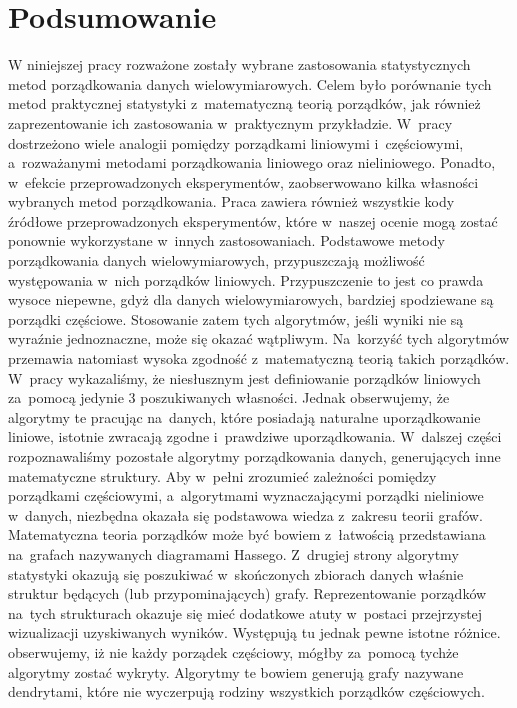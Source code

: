 \documentclass[12pt,a4paper]{report}
\begin{document}
\chapter{Podsumowanie}
W niniejszej pracy rozważone zostały wybrane zastosowania statystycznych metod porządkowania danych wielowymiarowych. Celem było porównanie tych metod praktycznej statystyki z~matematyczną teorią porządków, jak również zaprezentowanie ich zastosowania w~praktycznym przykładzie. W~pracy dostrzeżono wiele analogii pomiędzy porządkami liniowymi i~częściowymi, a~rozważanymi metodami porządkowania liniowego oraz nieliniowego. Ponadto, w~efekcie przeprowadzonych eksperymentów, zaobserwowano kilka własności wybranych metod porządkowania. Praca zawiera również wszystkie kody źródłowe przeprowadzonych eksperymentów, które w~naszej ocenie mogą zostać ponownie wykorzystane w~innych zastosowaniach.
Podstawowe metody porządkowania danych wielowymiarowych, przypuszczają możliwość występowania w~nich porządków liniowych. Przypuszczenie to jest co prawda wysoce niepewne, gdyż dla danych wielowymiarowych, bardziej spodziewane są porządki częściowe. Stosowanie zatem tych algorytmów, jeśli wyniki nie są wyraźnie jednoznaczne, może się okazać wątpliwym. Na~korzyść tych algorytmów przemawia natomiast wysoka zgodność z~matematyczną teorią takich porządków. W~pracy wykazaliśmy, że niesłusznym jest definiowanie porządków liniowych za~pomocą jedynie 3 poszukiwanych własności. Jednak obserwujemy, że algorytmy te pracując na~danych, które posiadają naturalne uporządkowanie liniowe, istotnie zwracają zgodne i~prawdziwe uporządkowania. W~dalszej części rozpoznawaliśmy pozostałe algorytmy porządkowania danych, generujących inne matematyczne struktury.
Aby w~pełni zrozumieć zależności pomiędzy porządkami częściowymi, a~algorytmami wyznaczającymi porządki nieliniowe w~danych, niezbędna okazała się podstawowa wiedza z~zakresu teorii grafów. Matematyczna teoria porządków może być bowiem z~łatwością przedstawiana na~grafach nazywanych diagramami Hassego. Z~drugiej strony algorytmy statystyki okazują się poszukiwać w~skończonych zbiorach danych właśnie struktur będących (lub przypominających) grafy. Reprezentowanie porządków na~tych strukturach okazuje się mieć dodatkowe atuty w~postaci przejrzystej wizualizacji uzyskiwanych wyników. Występują tu jednak pewne istotne różnice. obserwujemy, iż nie każdy porządek częściowy, mógłby za~pomocą tychże algorytmy zostać wykryty. Algorytmy te bowiem generują grafy nazywane dendrytami, które nie wyczerpują rodziny wszystkich porządków częściowych.
\end{document}
